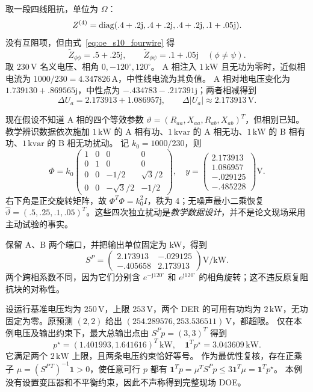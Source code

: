 \begin{example}[从中性线回流算到电压边界]
取一段四线阻抗，单位为 $\Omega$：
\[
 Z^{(4)}=\operatorname{diag}(.4+.2\mathrm j,.4+.2\mathrm j,.4+.2\mathrm j,.1+.05\mathrm j).
\]
没有互阻项，但由式~\eqref{eq:oe_s10_fourwire} 得
\[
 \widetilde Z_{\phi\phi}=.5+.25\mathrm j,\qquad
 \widetilde Z_{\phi\psi}=.1+.05\mathrm j\quad(\phi\ne\psi).
\]
取 $230\,\mathrm V$ 名义电压、相角 $0,-120^\circ,120^\circ$。
A 相注入 $1\,\mathrm{kW}$ 且无功为零时，近似相电流为 $1000/230=4.347826\,\mathrm A$，中性线电流为其负值。
A 相对地电压变化为 $1.739130+.869565\mathrm j$，中性点为
$-.434783-.217391\mathrm j$；两者相减得到
\[
 \Delta U_a=2.173913+1.086957\mathrm j,\qquad
 \Delta|U_a|\approx2.173913\,\mathrm V.
\]

现在假设不知道 A 相的四个等效参数
$\vartheta=(R_{aa},X_{aa},R_{ab},X_{ab})^T$，但相别已知。
教学辨识数据依次施加 $1\,\mathrm{kW}$ 的 A 相有功、$1\,\mathrm{kvar}$ 的 A 相无功、$1\,\mathrm{kW}$ 的 B 相有功、$1\,\mathrm{kvar}$ 的 B 相无功扰动。
记 $k_0=1000/230$，则
\[
 \Phi=k_0\begin{pmatrix}
 1&0&0&0\\0&1&0&0\\0&0&-1/2&\sqrt3/2\\0&0&-\sqrt3/2&-1/2
 \end{pmatrix},\quad
 y=\begin{pmatrix}2.173913\\1.086957\\-.029125\\-.485228\end{pmatrix}\mathrm V.
\]
右下角是正交旋转矩阵，故 $\Phi^T\Phi=k_0^2I$，秩为 4；无噪声最小二乘恢复
$\hat\vartheta=(.5,.25,.1,.05)^T$。这些四次独立扰动是\emph{教学数据设计}，并不是论文现场采用主动试验的事实。

保留 A、B 两个端口，并把输出单位固定为 kW，得到
\[
 S^P=\begin{pmatrix}
 2.173913&-.029125\\-.405658&2.173913
 \end{pmatrix}\mathrm{V/kW}.
\]
两个跨相系数不同，因为它们分别含 $e^{-\mathrm j120^\circ}$ 和
$e^{\mathrm j120^\circ}$ 的相角旋转；这不违反原复阻抗块的对称性。

设运行基准电压均为 $250\,\mathrm V$，上限 $253\,\mathrm V$，两个 DER 的可用有功均为 $2\,\mathrm{kW}$，无功固定为零。原预测 $(2,2)$ 给出
$(254.289576,253.536511)\,\mathrm V$，都超限。
仅在本例电压及输出约束下，最大总输出点由 $S^Pp=(3,3)^T$ 得到
\[
 p^\star=(1.401993,1.641616)^T\,\mathrm{kW},\quad
 \boldsymbol1^Tp^\star=3.043609\,\mathrm{kW}.
\]
它满足两个 $2\,\mathrm{kW}$ 上限，且两条电压约束恰好等号。
作为最优性复核，存在正乘子 $\mu=(S^{P\,T})^{-1}\boldsymbol1>0$，使任意可行 $p$ 都有
$\boldsymbol1^Tp=\mu^TS^Pp\le3\boldsymbol1^T\mu=\boldsymbol1^Tp^\star$。
本例没有设置变压器和不平衡约束，因此不声称得到完整现场 DOE。
\end{example}

